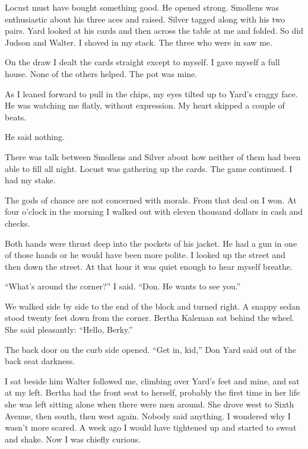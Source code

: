 \documentclass{novel}
\begin{document}
Locust must have bought something good. He opened strong. Smollens was enthusiastic about his three aces and raised. Silver tagged along with his two pairs. Yard looked at his cards and then across the table at me and folded. So did Judson and Walter. I shoved in my stack. The three who were in saw me.

On the draw I dealt the cards straight except to myself. I gave myself a full house. None of the others helped. The pot was mine.

As I leaned forward to pull in the chips, my eyes tilted up to Yard’s craggy face. He was watching me flatly, without expression. My heart skipped a couple of beats. 

He said nothing. 

There was talk between Smollens and Silver about how neither of them had been able to fill all night. Locust was gathering up the cards. The game continued. I had my stake.

The gods of chance are not concerned with morals. From that deal on I won. At four o’clock in the morning I walked out with eleven thousand dollars in cash and checks.

\vspace{2\nbs}
\clearpage
\thispagestyle{empty}
\begin{ChapterStart}
\vspace{3\nbs}
\end{ChapterStart}

Both hands were thrust deep into the pockets of his jacket. He had a gun in one of those hands or he would have been more polite. I looked up the street and then down the street. At that hour it was quiet enough to hear myself breathe.

“What’s around the corner?” I said. “Don. He wants to see you.”

We walked side by side to the end of the block and turned right. A snappy sedan stood twenty feet down from the corner. Bertha Kaleman sat behind the wheel. She said pleasantly: “Hello, Berky.”

The back door on the curb side opened. “Get in, kid,” Don Yard said out of the back seat darkness.

I sat beside him Walter followed me, climbing over Yard’s feet and mine, and sat at my left. Bertha had the front seat to herself, probably the first time in her life she was left sitting alone when there were men around. She drove west to Sixth Avenue, then south, then west again. Nobody said anything. I wondered why I wasn’t more scared. A week ago I would have tightened up and started to sweat and shake. Now I was chiefly curious.
\end{document}
